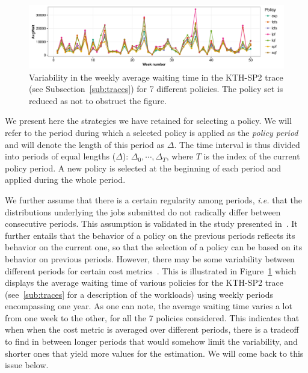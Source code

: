 \documentclass[sigconf,review]{acmart}
\begin{document}
\begin{figure}[ht]
  \centering
  \includegraphics[scale=0.6]{figures/variability.pdf}

  \caption{Variability in the weekly average waiting time in the KTH-SP2 trace
  (see Subsection~\ref{sub:traces}) for 7 different policies. The policy set is
  reduced as not to obstruct the figure.}

  \label{fig:mosn}
\end{figure}

We present here the strategies we have retained for selecting a policy. We will
refer to the period during which a selected policy is applied as the
\textit{policy period} and will denote the length of this period as $\Delta$.
The time interval is thus divided into periods of equal lengths ($\Delta$):
$\Delta_0, \cdots, \Delta_T$, where $T$ is the index of the current policy
period. A new policy is selected at the beginning of each period and applied
during the whole period.

We further assume that there is a certain regularity among periods,
\textit{i.e.} that the distributions underlying the jobs submitted do not
radically differ between consecutive periods. This assumption is validated in
the study presented in~\cite{jsspp17}. It further entails that the behavior of
a policy on the previous periods reflects its behavior on the current one, so
that the selection of a policy can be based on its behavior on previous
periods. However, there may be some variability between different periods for
certain cost metrics~\cite{feitelson2001metrics}. This is illustrated in
Figure~\ref{fig:mosn} which displays the average waiting time of various
policies for the KTH-SP2 trace (see~\ref{sub:traces} for a description of the
workloads) using weekly periods encompassing one year. As one can note, the
average waiting time varies a lot from one week to the other, for all the 7
policies considered. This indicates that when when the cost metric is averaged
over different periods, there is a tradeoff to find in between longer periods
that would somehow limit the variability, and shorter ones that yield more
values for the estimation. We will come back to this issue below.
\end{document}
